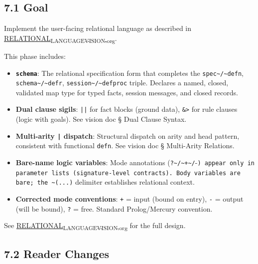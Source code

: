 \documentclass[11pt]{article}
\begin{document}
\subsection{7.1 Goal}
\label{sec:orgbd52048}

Implement the user-facing relational language as described in
\href{principles/RELATIONAL\_LANGUAGE\_VISION.org}{RELATIONAL\textsubscript{LANGUAGE}\textsubscript{VISION.org}}.

This phase includes:

\begin{itemize}
\item \textbf{\texttt{schema}}: The relational specification form that completes the
\texttt{spec\textasciitilde{}/\textasciitilde{}defn}, \texttt{schema\textasciitilde{}/\textasciitilde{}defr}, \texttt{session\textasciitilde{}/\textasciitilde{}defproc} triple. Declares a
named, closed, validated map type for typed facts, session messages, and
closed records.

\item \textbf{Dual clause sigils}: \texttt{||} for fact blocks (ground data), \texttt{\&>} for rule
clauses (logic with goals). See vision doc § Dual Clause Syntax.

\item \textbf{Multi-arity \texttt{|} dispatch}: Structural dispatch on arity and head pattern,
consistent with functional \texttt{defn}. See vision doc § Multi-Arity Relations.

\item \textbf{Bare-name logic variables}: Mode annotations (\texttt{?\textasciitilde{}/\textasciitilde{}+\textasciitilde{}/}-\texttt{) appear only in
  parameter lists (signature-level contracts). Body variables are bare; the
  \textasciitilde{}(...)} delimiter establishes relational context.

\item \textbf{Corrected mode conventions}: \texttt{+} = input (bound on entry), \texttt{-} = output
(will be bound), \texttt{?} = free. Standard Prolog/Mercury convention.
\end{itemize}

See \href{principles/RELATIONAL\_LANGUAGE\_VISION.org}{RELATIONAL\textsubscript{LANGUAGE}\textsubscript{VISION.org}} for the full design.
\subsection{7.2 Reader Changes}
\label{sec:orgbf192e3}
\end{document}
